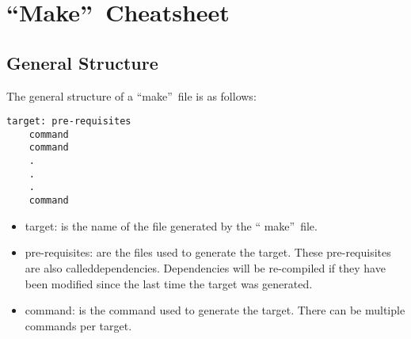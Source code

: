 \section{\textquotedblleft Make\textquotedblright\ Cheatsheet}

\subsection{General Structure}

The general structure of a \textquotedblleft make\textquotedblright\ file is as
follows:
\begin{verbatim}
target: pre-requisites
    command
    command
    .
    .
    .
    command
\end{verbatim}
\begin{itemize}
    \item target: is the name of the file generated by the \textquotedblleft
    make\textquotedblright\ file.
    \item pre-requisites: are the files used to generate the target. These 
    pre-requisites are also called\linebreak dependencies. Dependencies will be 
    re-compiled if they have been modified since the last time the target was
    generated.
    \item command: is the command used to generate the target. There can be
    multiple commands per target.
\end{itemize}

